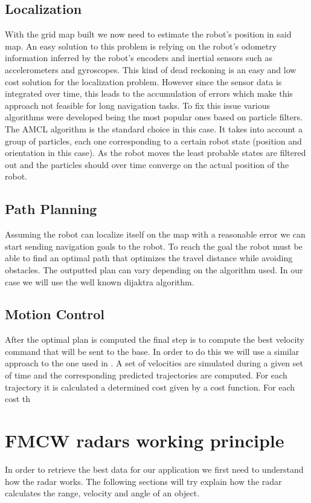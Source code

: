 \subsection{Localization}
With the grid map built we now need to estimate the robot's position in said map. 
An easy solution to this problem is relying on the robot's odometry information inferred by the robot's encoders and inertial sensors such as accelerometers and gyroscopes. This kind of dead reckoning is an easy and low cost solution for the localization problem. However since the sensor data is integrated over time, this leads to the accumulation of errors which make this approach not feasible for long navigation tasks. 
To fix this issue various algorithms were developed being the most popular ones based on particle filters.
The \ac{AMCL} algorithm  is the standard choice in this case. It takes into account a group of particles, each one corresponding to a certain robot state (position and orientation in this case). As the robot moves the least probable states are filtered out and  the particles should over time converge on the actual position of the robot.  
\subsection{Path Planning}
Assuming the robot can localize itself on the map with a reasonable error we can start sending navigation goals to the robot. To reach the goal the robot must be able to find an optimal path that optimizes the travel distance while avoiding obstacles. The outputted plan can vary depending on the algorithm used. In our case we will use the well known dijaktra algorithm.
\subsection{Motion Control}
After the optimal plan is computed the final step is to compute the best velocity command that will be sent to the base.  In order to do this we will use a similar approach to the one used in \cite{gerkey2008planning}. A set of velocities are simulated during a given set of time and the corresponding predicted trajectories are  computed. For each trajectory it is calculated a determined cost given by a cost function. For each cost th
\section {\ac{FMCW} radars working principle}
In order to retrieve the best data for our application we first need to understand how the radar works. The following sections will try explain how the radar calculates the range, velocity and angle of an object.

